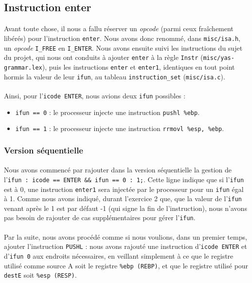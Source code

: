 \documentclass[12pt]{article}
\begin{document}
\subsection{Instruction enter}
\paragraph{}Avant toute chose, il nous a fallu réserver un {\itshape opcode} (parmi ceux fraîchement libérés) pour l'instruction \verb+enter+. Nous avons donc renommé, dans \verb+misc/isa.h+, un {\itshape opcode} \verb+I_FREE+ en \verb+I_ENTER+. Nous avons ensuite suivi les instructions du sujet du projet, qui nous ont conduits à ajouter \verb+enter+ à la règle \verb+Instr+ (\verb+misc/yas-grammar.lex+), puis les instructions \verb+enter+ et \verb+enter1+, identiques en tout point hormis la valeur de leur \verb+ifun+, au tableau \verb+instruction_set+ (\verb+misc/isa.c+).

\paragraph{}Ainsi, pour l'\verb+icode ENTER+, nous avions deux \verb+ifun+ possibles :
\begin{itemize}
\item \verb+ifun == 0+ : le processeur injecte une instruction \verb+pushl %ebp+.
  \item \verb+ifun == 1+ : le processeur injecte une instruction \verb+rrmovl %esp, %ebp+.
\end{itemize}

\subsubsection{Version séquentielle}
\paragraph{}Nous avons commencé par rajouter dans la version séquentielle la gestion de l'\verb+ifun : icode == ENTER && ifun == 0 : 1;+. Cette ligne indique que si l'\verb+ifun+ est à 0, une instruction \verb+enter1+ sera injectée par le processeur pour un \verb+ifun+ égal à 1. Comme nous avons indiqué, durant l'exercice 2 que, que la valeur de l'\verb+ifun+ venant après le 1 est par défaut -1 (qui signe la fin de l'instruction), nous n'avons pas besoin de rajouter de cas supplémentaires pour gérer l'\verb+ifun+.

\paragraph{}Par la suite, nous avons procédé comme si nous voulions, dans un premier temps, ajouter l'instruction \verb+PUSHL+ : nous avons rajouté une instruction d'\verb+icode ENTER+ et d'\verb+ifun 0+ aux endroits nécessaires, en veillant simplement à ce que le registre utilisé comme source A soit le registre \verb+%ebp (REBP)+, et que le registre utilisé pour \verb+destE+ soit \verb+%esp (RESP)+.
\end{document}
